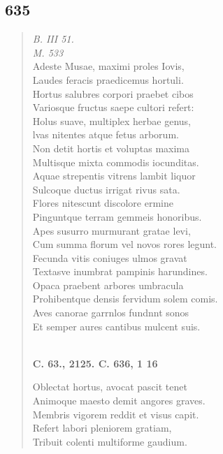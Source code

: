 \documentclass[11pt, a4paper]{report}
\begin{document}
            \subsection*{635}
      \begin{verse}
      \textit{B. III 51.} \\ \textit{M. 533} \\ Adeste Musae, maximi proles Iovis, \\ Laudes feracis praedicemus hortuli. \\ Hortus salubres corpori praebet cibos \\ Variosque fructus saepe cultori refert: \\ Holus suave, multiplex herbae genus, \\ lvas nitentes atque fetus arborum. \\ Non detit hortis et voluptas maxima \\ Multisque mixta commodis iocunditas. \\ Aquae strepentis vitrens lambit liquor \\ Sulcoque ductus irrigat rivus sata. \\ Flores nitescunt discolore ermine \\ Pinguntque terram gemmeis honoribus. \\ Apes susurro murmurant gratae levi, \\ Cum summa florum vel novos rores legunt. \\ Fecunda vitis coniuges ulmos gravat \\ Textasve inumbrat pampinis harundines. \\ Opaca praebent arbores umbracula \\ Prohibentque densis fervidum solem comis. \\ Aves canorae garrnlos fundnnt sonos \\ Et semper aures cantibus mulcent suis. \\ 
        ﻿\pagebreak 
     \marginpar{[102]} \begin{center} \textbf{C. 63., 2125. C. 636, 1 16} \end{center}Oblectat hortus, avocat pascit tenet \\ Animoque maesto demit angores graves. \\ Membris vigorem reddit et visus capit. \\ Refert labori pleniorem gratiam, \\ Tribuit colenti multiforme gaudium. \\ 
      \end{verse}
  
\end{document}
